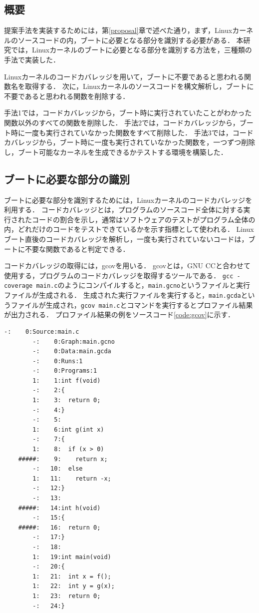 \documentclass[graduation-thesis]{mlarticle}
\begin{document}
\subsection{概要}
\label{implementation:abstruction}
提案手法を実装するためには，第\ref{proposal}章で述べた通り，まず，Linuxカーネルのソースコードの内，ブートに必要となる部分を識別する必要がある．
本研究では，Linuxカーネルのブートに必要となる部分を識別する方法を，三種類の手法で実装した．

Linuxカーネルのコードカバレッジを用いて，ブートに不要であると思われる関数名を取得する．
次に，Linuxカーネルのソースコードを構文解析し，ブートに不要であると思われる関数を削除する．

手法1では，コードカバレッジから，ブート時に実行されていたことがわかった関数以外のすべての関数を削除した．
手法2では，コードカバレッジから，ブート時に一度も実行されていなかった関数をすべて削除した．
手法3では，コードカバレッジから，ブート時に一度も実行されていなかった関数を，一つずつ削除し，ブート可能なカーネルを生成できるかテストする環境を構築した．


\subsection{ブートに必要な部分の識別}
\label{implementation:boot}
ブートに必要な部分を識別するためには，Linuxカーネルのコードカバレッジを利用する．
コードカバレッジとは，プログラムのソースコード全体に対する実行されたコードの割合を示し，通常はソフトウェアのテストがプログラム全体の内，どれだけのコードをテストできているかを示す指標として使われる．
Linuxブート直後のコードカバレッジを解析し，一度も実行されていないコードは，ブートに不要な関数であると判定できる．

コードカバレッジの取得には，gcovを用いる．
gcovとは，GNU CCと合わせて使用する，プログラムのコードカバレッジを取得するツールである．
\texttt{gcc -coverage main.c}のようにコンパイルすると，\texttt{main.gcno}というファイルと実行ファイルが生成される．
生成された実行ファイルを実行すると，\texttt{main.gcda}というファイルが生成され，\texttt{gcov main.c}とコマンドを実行するとプロファイル結果が出力される．
プロファイル結果の例をソースコード\ref{code:gcov}に示す．

\begin{lstlisting}[caption=gcovの実行結果例, label=code:gcov]
        -:    0:Source:main.c
        -:    0:Graph:main.gcno
        -:    0:Data:main.gcda
        -:    0:Runs:1
        -:    0:Programs:1
        1:    1:int f(void)
        -:    2:{
        1:    3:  return 0;
        -:    4:}
        -:    5:
        1:    6:int g(int x)
        -:    7:{
        1:    8:  if (x > 0)
    #####:    9:    return x;
        -:   10:  else
        1:   11:    return -x;
        -:   12:}
        -:   13:
    #####:   14:int h(void)
        -:   15:{
    #####:   16:  return 0;
        -:   17:}
        -:   18:
        1:   19:int main(void)
        -:   20:{
        1:   21:  int x = f();
        1:   22:  int y = g(x);
        1:   23:  return 0;
        -:   24:}
\end{lstlisting}
\end{document}
